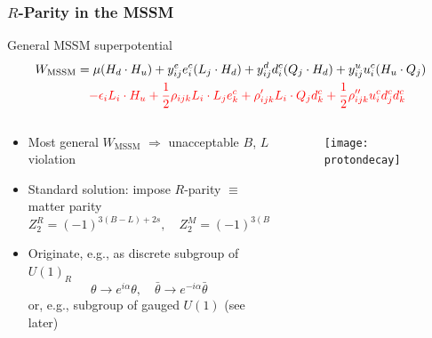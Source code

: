 \documentclass[10pt,aspectratio=169]{beamer}
\begin{document}
\begin{frame}
  \frametitle{$R$-Parity in the MSSM}
  \vspace*{-5pt}
  \begin{block}{General MSSM superpotential}
    \begin{align*}
      W_{\text{MSSM}} &= \mu ( H_d \cdot H_u )
      + y_{ij}^e e^c_i ( L_j \cdot H_d )
      + y_{ij}^d d^c_i ( Q_j \cdot H_d )
      + y_{ij}^u u_i^c ( H_u \cdot Q_j ) \\
      & \quad {} {\color{red} - \epsilon_i L_i \cdot H_u
      + \frac{1}{2} \rho_{ijk} L_i \cdot L_j e_k^c
      + \rho^\prime_{ijk} L_i \cdot Q_j d_k^c
      + \frac{1}{2} \rho^{\prime\prime}_{ijk} u_i^c d_j^c d_k^c }
    \end{align*}
  \end{block}
  \vspace*{-10pt}
  \begin{columns}[t]
    \begin{column}{0.5\textwidth}
      \begin{itemize}
      \item Most general $W_{\text{MSSM}}$ $\Rightarrow$
        unacceptable $B$, $L$ violation
      \item Standard solution: impose {\color{blue} $R$-parity
        $\equiv$ matter parity}
        \begin{equation*}
          Z_2^R = (-1)^{3 (B - L) + 2 s}, \quad
          Z_2^M = (-1)^{3(B - L)}
        \end{equation*}
      \item Originate, e.g., as discrete subgroup of $U(1)_R$
        \begin{equation*}
          \theta \to e^{i \alpha} \theta , \quad \bar{\theta} \to
          e^{-i \alpha} \bar{\theta}
        \end{equation*}
        or, e.g., subgroup of gauged $U(1)$ (see later)
      \end{itemize}
    \end{column}
    \begin{column}{0.5\textwidth}
      \begin{figure}
        \texttt{[image: protondecay]}
      \end{figure}
    \end{column}
  \end{columns}
\end{frame}
\end{document}
